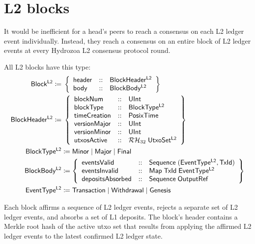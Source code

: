\documentclass[../hydrozoa.tex]{subfiles}
\begin{document}
\chapter{L2 blocks}%
\label{h:l2-blocks}%

It would be inefficient for a head's peers to reach a consensus on each L2 ledger event individually.
Instead, they reach a consensus on an entire block of L2 ledger events at every Hydrozoa L2 consensus protocol round.

All L2 blocks have this type:
\begin{equation*}
\begin{split}
  \T{Block^{L2}} \coloneq&\; \left\{
    \begin{array}{lll}
      \T{header} &::& \T{BlockHeader^{L2}} \\
      \T{body} &::& \T{BlockBody^{L2}}
    \end{array}\right\} \\
  \blockHeaderTypeName{} \coloneq&\; \blockHeaderTypeBody{} \\
  \T{BlockType^{L2}} &\coloneq
    \T{Minor} \mid
    \T{Major} \mid
    \T{Final} \\
  \T{BlockBody^{L2}} &\coloneq \left\{
  \begin{array}{lll}
    \T{eventsValid} &::&
      \T{Sequence} \; (\T{EventType^{L2}}, \T{TxId}) \\
    \T{eventsInvalid} &::&
      \T{Map} \; \T{TxId} \; \T{EventType^{L2}} \\
    \T{depositsAbsorbed} &::& \T{Sequence} \; \T{OutputRef}
  \end{array}\right\} \\
  \T{EventType^{L2}} &\coloneq \T{Transaction} \mid \T{Withdrawal} \mid \T{Genesis}
\end{split}
\end{equation*}

Each block affirms a sequence of L2 ledger events, rejects a separate set of L2 ledger events, and absorbs a set of L1 deposits.
The block's header contains a Merkle root hash of the active utxo set that results from applying the affirmed L2 ledger events to the latest confirmed L2 ledger state.
\end{document}
